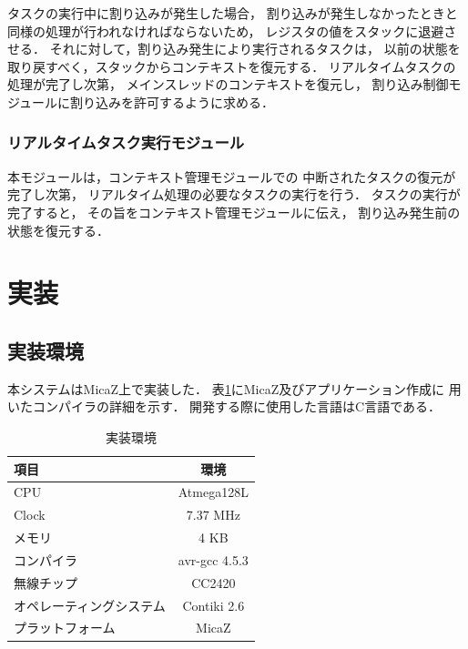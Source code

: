 \vspace{0.5em}タスクの実行中に割り込みが発生した場合，
割り込みが発生しなかったときと同様の処理が行われなければならないため，
レジスタの値をスタックに退避させる．
それに対して，割り込み発生により実行されるタスクは，
以前の状態を取り戻すべく，スタックからコンテキストを復元する．
リアルタイムタスクの処理が完了し次第，
メインスレッドのコンテキストを復元し，
割り込み制御モジュールに割り込みを許可するように求める．



\subsubsection{リアルタイムタスク実行モジュール}

\vspace{0.5em}本モジュールは，コンテキスト管理モジュールでの
中断されたタスクの復元が完了し次第，
リアルタイム処理の必要なタスクの実行を行う．
タスクの実行が完了すると，
その旨をコンテキスト管理モジュールに伝え，
割り込み発生前の状態を復元する．












\section{実装}
\subsection{実装環境}
本システムはMicaZ上で実装した．
表\ref{tab:implementation_env}にMicaZ及びアプリケーション作成に
用いたコンパイラの詳細を示す．
開発する際に使用した言語はC言語である．


\begin{table}[htb]
  \centering
  \caption{実装環境}
  \begin{tabular}{|l||c|} \hline
  	項目	 & 環境 \\ \hline \hline
	CPU & Atmega128L \\ \hline
	Clock	& 7.37 MHz \\ \hline
	メモリ & 4 KB \\ \hline
	コンパイラ	& avr-gcc 4.5.3 \\ \hline
	無線チップ	& CC2420 \\ \hline
	オペレーティングシステム & Contiki 2.6 \\ \hline
	プラットフォーム & MicaZ \\ \hline
  \end{tabular}
  \label{tab:implementation_env}
\end{table}



